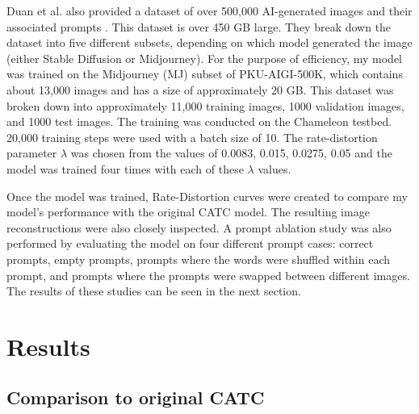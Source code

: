 Duan et al. also provided a dataset of over 500,000 AI-generated images and their associated prompts \cite{duan2024PKU-AIGI-500K}. This dataset is over 450 GB large. They break down the dataset into five different subsets, depending on which model generated the image (either Stable Diffusion or Midjourney). For the purpose of efficiency, my model was trained on the Midjourney (MJ) subset of PKU-AIGI-500K, which contains about 13,000 images and has a size of approximately 20 GB. This dataset was broken down into approximately 11,000 training images, 1000 validation images, and 1000 test images. The training was conducted on the Chameleon testbed. 20,000 training steps were used with a batch size of 10. The rate-distortion parameter $\lambda$ was chosen from the values of 0.0083, 0.015, 0.0275, 0.05 and the model was trained four times with each of these $\lambda$ values. \par
Once the model was trained, Rate-Distortion curves were created to compare my model's performance with the original CATC model. The resulting image reconstructions were also closely inspected. A prompt ablation study was also performed by evaluating the model on four different prompt cases: correct prompts, empty prompts, prompts where the words were shuffled within each prompt, and prompts where the prompts were swapped between different images. The results of these studies can be seen in the next section.

\section{Results}

\subsection{Comparison to original CATC}

